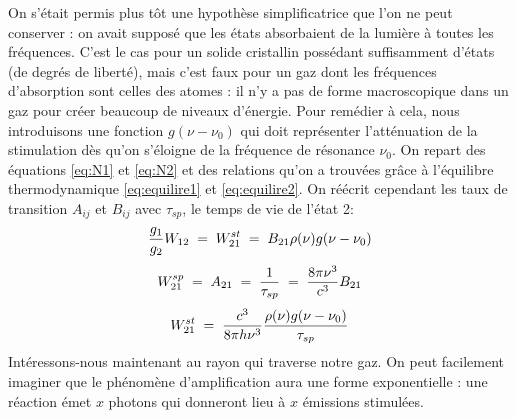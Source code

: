 On s'était permis plus tôt une hypothèse simplificatrice que l'on ne peut conserver : on avait supposé que les états absorbaient de la lumière à toutes les fréquences. C'est le cas pour un solide cristallin possédant suffisamment d'états (de degrés de liberté), mais c'est faux pour un gaz dont les fréquences d'absorption sont celles des atomes : il n'y a pas de forme macroscopique dans un gaz pour créer beaucoup de niveaux d'énergie. Pour remédier à cela, nous introduisons une fonction $g(\nu - \nu_0)$ qui doit représenter l'atténuation de la stimulation dès qu'on s'éloigne de la fréquence de résonance $\nu_0$. On repart des équations \ref{eq:N1} et \ref{eq:N2} et des relations qu'on a trouvées grâce à l'équilibre thermodynamique \ref{eq:equilire1} et \ref{eq:equilire2}. On réécrit cependant les taux de transition $A_{ij}$ et $B_{ij}$ avec $\tau_{sp}$, le temps de vie de l'état 2:
\[
    \dfrac{g_1}{g_2}W_{12} \; = \; W_{21}^{st} \; = \; B_{21} \rho(\nu) g(\nu - \nu_0)
\]
\[
    W_{21}^{sp} \; = \; A_{21} \; = \; \dfrac{1}{\tau_{sp}} \; = \; \dfrac{8\pi \nu^3}{c^3}B_{21}
\]
\[
    W_{21}^{st} \; = \; \dfrac{c^3}{8\pi h \nu^3}\dfrac{\rho(\nu) g(\nu - \nu_0)}{\tau_{sp}}
\]
Intéressons-nous maintenant au rayon qui traverse notre gaz. On peut facilement imaginer que le phénomène d'amplification aura une forme exponentielle : une réaction émet $x$ photons qui donneront lieu à $x$ émissions stimulées.\\

